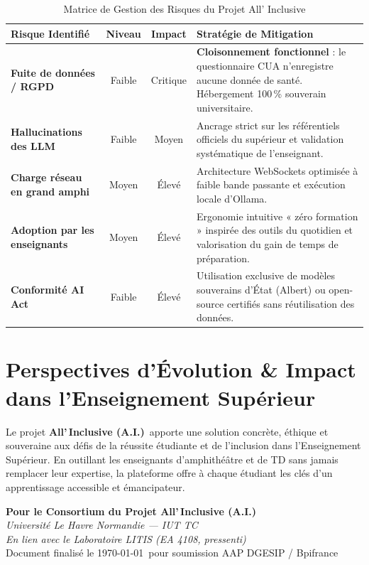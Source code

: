 \documentclass[11pt,a4paper]{article}
\newcommand{\AIFull}{\textbf{\textcolor{primaryRed}{A}ll'\,\textcolor{primaryRed}{I}nclusive (A.I.)}}
\begin{document}
\begin{table}[h!]
\centering
\small
\begin{tabularx}{\textwidth}{l c c X}
\toprule
\textbf{Risque Identifié} & \textbf{Niveau} & \textbf{Impact} & \textbf{Stratégie de Mitigation} \\
\midrule
\textbf{Fuite de données / RGPD} & Faible & Critique & \textbf{Cloisonnement fonctionnel} : le questionnaire CUA n'enregistre aucune donnée de santé. Hébergement 100\,\% souverain universitaire. \\
\addlinespace
\textbf{Hallucinations des LLM} & Faible & Moyen & Ancrage strict sur les référentiels officiels du supérieur et validation systématique de l'enseignant. \\
\addlinespace
\textbf{Charge réseau en grand amphi} & Moyen & Élevé & Architecture WebSockets optimisée à faible bande passante et exécution locale d'Ollama. \\
\addlinespace
\textbf{Adoption par les enseignants} & Moyen & Élevé & Ergonomie intuitive « zéro formation » inspirée des outils du quotidien et valorisation du gain de temps de préparation. \\
\addlinespace
\textbf{Conformité AI Act} & Faible & Élevé & Utilisation exclusive de modèles souverains d'État (Albert) ou open-source certifiés sans réutilisation des données. \\
\bottomrule
\end{tabularx}
\caption{Matrice de Gestion des Risques du Projet All' Inclusive}
\end{table}

\section{Perspectives d'Évolution \& Impact dans l'Enseignement Supérieur}

Le projet \AIFull\ apporte une solution concrète, éthique et souveraine aux défis de la réussite étudiante et de l'inclusion dans l'Enseignement Supérieur. En outillant les enseignants d'amphithéâtre et de TD sans jamais remplacer leur expertise, la plateforme offre à chaque étudiant les clés d'un apprentissage accessible et émancipateur.

\vspace{1cm}
\begin{flushright}
    \textbf{Pour le Consortium du Projet \AIFull}\\[0.1cm]
    \textit{Université Le Havre Normandie --- IUT TC}\\
    \textit{En lien avec le Laboratoire LITIS (EA 4108, pressenti)}\\[0.3cm]
    \small Document finalisé le \today\ pour soumission AAP DGESIP / Bpifrance
\end{flushright}
\end{document}
